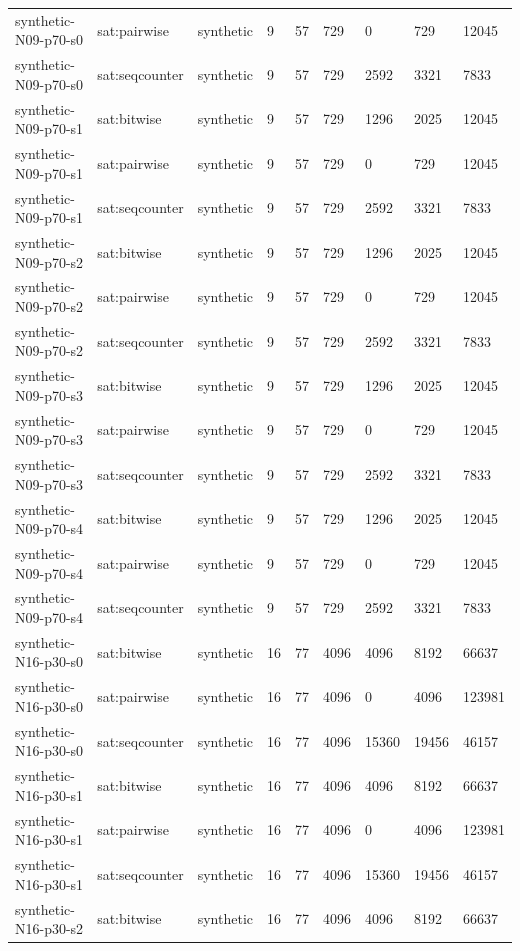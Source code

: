 \begin{tabular}{lllllllll}
synthetic-N09-p70-s0 & sat:pairwise & synthetic & 9 & 57 & 729 & 0 & 729 & 12045 \\
synthetic-N09-p70-s0 & sat:seqcounter & synthetic & 9 & 57 & 729 & 2592 & 3321 & 7833 \\
synthetic-N09-p70-s1 & sat:bitwise & synthetic & 9 & 57 & 729 & 1296 & 2025 & 12045 \\
synthetic-N09-p70-s1 & sat:pairwise & synthetic & 9 & 57 & 729 & 0 & 729 & 12045 \\
synthetic-N09-p70-s1 & sat:seqcounter & synthetic & 9 & 57 & 729 & 2592 & 3321 & 7833 \\
synthetic-N09-p70-s2 & sat:bitwise & synthetic & 9 & 57 & 729 & 1296 & 2025 & 12045 \\
synthetic-N09-p70-s2 & sat:pairwise & synthetic & 9 & 57 & 729 & 0 & 729 & 12045 \\
synthetic-N09-p70-s2 & sat:seqcounter & synthetic & 9 & 57 & 729 & 2592 & 3321 & 7833 \\
synthetic-N09-p70-s3 & sat:bitwise & synthetic & 9 & 57 & 729 & 1296 & 2025 & 12045 \\
synthetic-N09-p70-s3 & sat:pairwise & synthetic & 9 & 57 & 729 & 0 & 729 & 12045 \\
synthetic-N09-p70-s3 & sat:seqcounter & synthetic & 9 & 57 & 729 & 2592 & 3321 & 7833 \\
synthetic-N09-p70-s4 & sat:bitwise & synthetic & 9 & 57 & 729 & 1296 & 2025 & 12045 \\
synthetic-N09-p70-s4 & sat:pairwise & synthetic & 9 & 57 & 729 & 0 & 729 & 12045 \\
synthetic-N09-p70-s4 & sat:seqcounter & synthetic & 9 & 57 & 729 & 2592 & 3321 & 7833 \\
synthetic-N16-p30-s0 & sat:bitwise & synthetic & 16 & 77 & 4096 & 4096 & 8192 & 66637 \\
synthetic-N16-p30-s0 & sat:pairwise & synthetic & 16 & 77 & 4096 & 0 & 4096 & 123981 \\
synthetic-N16-p30-s0 & sat:seqcounter & synthetic & 16 & 77 & 4096 & 15360 & 19456 & 46157 \\
synthetic-N16-p30-s1 & sat:bitwise & synthetic & 16 & 77 & 4096 & 4096 & 8192 & 66637 \\
synthetic-N16-p30-s1 & sat:pairwise & synthetic & 16 & 77 & 4096 & 0 & 4096 & 123981 \\
synthetic-N16-p30-s1 & sat:seqcounter & synthetic & 16 & 77 & 4096 & 15360 & 19456 & 46157 \\
synthetic-N16-p30-s2 & sat:bitwise & synthetic & 16 & 77 & 4096 & 4096 & 8192 & 66637 \\

\end{tabular}
